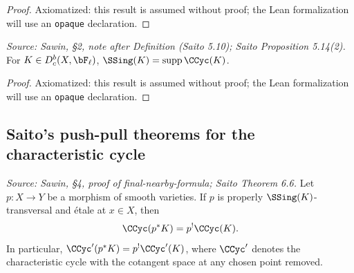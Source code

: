 \begin{proof}
  Axiomatized: this result is assumed without proof; the Lean formalization will use
  an \texttt{opaque} declaration.
\end{proof}

\begin{theorem}
  \label{thm:saito_prop_514}
  \textit{Source: Sawin, §2, note after Definition (Saito 5.10); Saito Proposition 5.14(2).}
  For $K\in D^b_c(X,\bF_\ell)$, $\SSing(K) = \operatorname{supp}\CCyc(K)$.
\end{theorem}

\begin{proof}
  Axiomatized: this result is assumed without proof; the Lean formalization will use
  an \texttt{opaque} declaration.
\end{proof}

\subsection{Saito's push-pull theorems for the characteristic cycle}

\begin{theorem}
  \label{thm:saito_cc_pullback}
  \textit{Source: Sawin, §4, proof of final-nearby-formula; Saito Theorem 6.6.}
  Let $p:X\to Y$ be a morphism of smooth varieties.  If $p$ is properly
  $\SSing(K)$-transversal and étale at $x\in X$, then
  \[ \CCyc(p^*K) = p^!\CCyc(K). \]
  In particular, $\CCyc'(p^*K) = p^!\CCyc'(K)$, where $\CCyc'$ denotes the
  characteristic cycle with the cotangent space at any chosen point removed.
\end{theorem}


